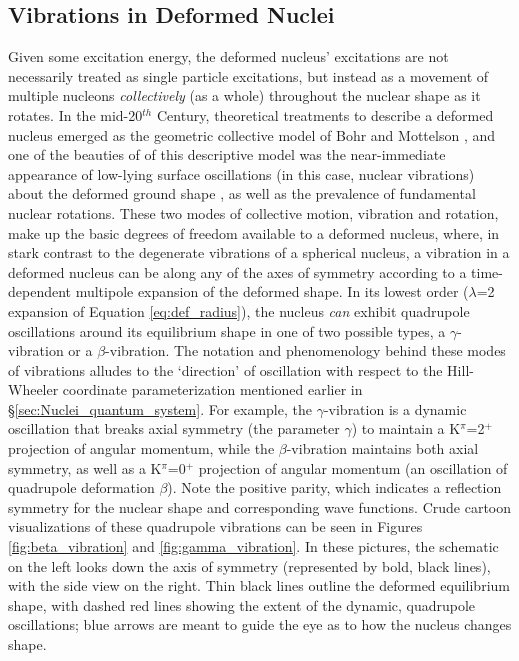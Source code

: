 \subsection{Vibrations in Deformed Nuclei}
Given some excitation energy, the deformed nucleus' excitations are not necessarily treated as single particle excitations, but instead as a movement of multiple nucleons \textit{collectively} (as a whole) throughout the nuclear shape as it rotates. In the mid-20$^{th}$ Century, theoretical treatments to describe a deformed nucleus emerged as the geometric collective model of Bohr and Mottelson \cite{BohrMott_text}, and one of the beauties of of this descriptive model was the near-immediate appearance of low-lying surface oscillations (in this case, nuclear vibrations) about the deformed ground shape \cite{BohrMott_text}, as well as the prevalence of fundamental nuclear rotations. These two modes of collective motion, vibration and rotation, make up the basic degrees of freedom available to a deformed nucleus, where, in stark contrast to the degenerate vibrations of a spherical nucleus, a vibration in a deformed nucleus can be along any of the axes of symmetry according to a time-dependent multipole expansion of the deformed shape. In its lowest order ($\lambda$=2 expansion of Equation \ref{eq:def_radius}), the nucleus \textit{can} exhibit quadrupole oscillations around its equilibrium shape in one of two possible types, a $\gamma$-vibration or a $\beta$-vibration. The notation and phenomenology behind these modes of vibrations alludes to the `direction' of oscillation with respect to the Hill-Wheeler coordinate parameterization mentioned earlier in \S\ref{sec:Nuclei_quantum_system}. For example, the $\gamma$-vibration is a dynamic oscillation that breaks axial symmetry (the parameter $\gamma$) to maintain a K$^\pi$=2$^+$ projection of angular momentum, while the $\beta$-vibration maintains both axial symmetry, as well as a K$^\pi$=0$^+$ projection of angular momentum (an oscillation of quadrupole deformation $\beta$). Note the positive parity, which indicates a reflection symmetry for the nuclear shape and corresponding wave functions. Crude cartoon visualizations of these quadrupole vibrations can be seen in Figures \ref{fig:beta_vibration} and \ref{fig:gamma_vibration}. In these pictures, the schematic on the left looks down the axis of symmetry (represented by bold, black lines), with the side view on the right. Thin black lines outline the deformed equilibrium shape, with dashed red lines showing the extent of the dynamic, quadrupole oscillations; blue arrows are meant to guide the eye as to how the nucleus changes shape. 

